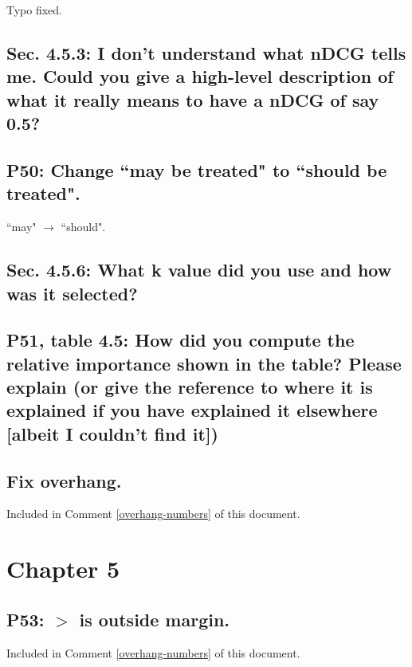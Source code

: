 \documentclass[]{article}
\begin{document}
Typo fixed.

\subsection{Sec. 4.5.3: I don't understand what nDCG tells me. Could you give a high-level description of what it really means to have a nDCG of say 0.5?}

\subsection{P50: Change ``may be treated" to ``should be treated".} 

``may" $\rightarrow$ ``should".
	
\subsection{Sec. 4.5.6: What k value did you use and how was it selected?}

\subsection{P51, table 4.5: How did you compute the relative importance shown in the table? Please explain (or give the reference to where it is explained if you have explained it elsewhere [albeit I couldn't find it])}

\subsection{Fix overhang.}

Included in Comment \ref{overhang-numbers} of this document.

\section{Chapter 5}

\subsection{P53: $>$ is outside margin.}

Included in Comment \ref{overhang-numbers} of this document.
\end{document}

